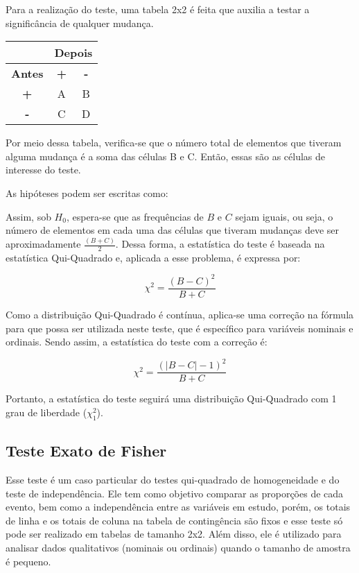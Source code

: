 \documentclass[
  portuguese,
]{estat/estat}
\begin{document}
Para a realização do teste, uma tabela 2x2 é feita que auxilia a testar
a significância de qualquer mudança.

\begin{table}[H]
\centering
\begin{tabular}{c|cc}
\multicolumn{1}{l|}{} & \multicolumn{2}{c}{\textbf{Depois}} \\ 
\midrule
\textbf{Antes}  &\textbf{+} & \textbf{-}    \\ 
\midrule
\textbf{+}      & A         & B     \\
\textbf{-}      & C         & D               
\end{tabular}
\end{table}

Por meio dessa tabela, verifica-se que o número total de elementos que
tiveram alguma mudança é a soma das células B e C. Então, essas são as
células de interesse do teste.

As hipóteses podem ser escritas como:


Assim, sob \(H_{0}\), espera-se que as frequências de \(B\) e \(C\)
sejam iguais, ou seja, o número de elementos em cada uma das células que
tiveram mudanças deve ser aproximadamente
\(\displaystyle\frac{(B + C)}{2}\). Dessa forma, a estatística do teste
é baseada na estatística Qui-Quadrado e, aplicada a esse problema, é
expressa por:

\[ \chi^{2} = \frac{(B - C)^{2}}{B + C} \]

Como a distribuição Qui-Quadrado é contínua, aplica-se uma correção na
fórmula para que possa ser utilizada neste teste, que é específico para
variáveis nominais e ordinais. Sendo assim, a estatística do teste com a
correção é:

\[ \chi^{2} = \frac{(|B - C| - 1)^{2}}{B + C} \]

Portanto, a estatística do teste seguirá uma distribuição Qui-Quadrado
com 1 grau de liberdade (\(\chi_{1}^{2}\)).

\subsection{Teste Exato de Fisher}\label{teste-exato-de-fisher}

Esse teste é um caso particular do testes qui-quadrado de homogeneidade
e do teste de independência. Ele tem como objetivo comparar as
proporções de cada evento, bem como a independência entre as variáveis
em estudo, porém, os totais de linha e os totais de coluna na tabela de
contingência são fixos e esse teste só pode ser realizado em tabelas de
tamanho 2x2. Além disso, ele é utilizado para analisar dados
qualitativos (nominais ou ordinais) quando o tamanho de amostra é
pequeno.
\end{document}

